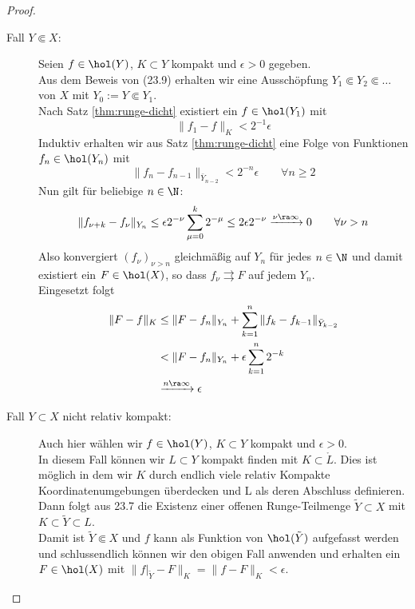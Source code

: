 \begin{proof}
  \begin{description}
  \item[Fall $Y \Subset X$:] Seien $f \in \hol(Y)$, $K \subset Y$
    kompakt und $\epsilon > 0$ gegeben. \\
    Aus dem Beweis von (23.9) erhalten wir eine Ausschöpfung $Y_1
    \Subset Y_2 \Subset \dots$ von $X$ mit $Y_0 := Y \Subset Y_1$. \\
    Nach Satz \ref{thm:runge-dicht} existiert ein $f \in \hol(Y_1)$
    mit
    \[
    \|f_1 - f\|_K < 2^{-1} \epsilon
    \]
    Induktiv erhalten wir aus Satz \ref{thm:runge-dicht} eine Folge
    von Funktionen $f_n \in \hol(Y_n)$ mit
    \[
    \|f_n - f_{n-1}\|_{\bar Y_{n-2}} < 2^{-n} \epsilon \qquad \forall
    n \geq 2
    \]
    Nun gilt für beliebige $n \in \N$:
    \[
    \|f_{\nu + k} - f_{\nu} \|_{Y_n} \leq \epsilon 2^{-\nu} \sum_{\mu
      = 0}^k 2^{-\mu} \leq 2 \epsilon 2^{-\nu} \xrightarrow{\nu \ra
      \infty} 0 \qquad \forall \nu > n
    \]
    Also konvergiert $(f_\nu)_{\nu > n}$ gleichmäßig auf $Y_n$ für
    jedes $n \in \N$ und damit existiert ein $F \in \hol(X)$, so dass
    $f_\nu \rightrightarrows F$ auf jedem $Y_n$. \\
    Eingesetzt folgt
    \begin{align*}
      \|F - f\|_K & \leq \|F - f_n\|_{Y_n} + \sum_{k=1}^n \|f_k -
      f_{k-1}\|_{\bar Y_{k-2}} \\
      & < \|F - f_n \|_{Y_n} + \epsilon \sum_{k=1}^n 2^{-k} \\
      & \xrightarrow{n \ra \infty} \epsilon
    \end{align*}
  \item[Fall $Y \subset X$ nicht relativ kompakt:] Auch hier wählen
    wir $f \in \hol(Y)$, $K \subset Y$ kompakt und $\epsilon > 0$. \\
    In diesem Fall können wir $L \subset Y$ kompakt finden mit $K \subset
    \mathring L$. Dies ist möglich in dem wir $K$ durch endlich viele relativ
    Kompakte Koordinatenumgebungen überdecken und L als deren
    Abschluss definieren. \\
    Dann folgt aus 23.7 die Existenz einer offenen Runge-Teilmenge
    $\tilde Y \subset X$ mit $K \subset \tilde Y \subset L$. \\
    Damit ist $\tilde Y \Subset X$ und $f$ kann als Funktion von
    $\hol(\tilde Y)$ aufgefasst werden und schlussendlich können wir
    den obigen Fall anwenden und erhalten ein $F \in \hol(X)$ mit
    $\|f|_{\tilde Y} - F\|_K = \|f - F\|_K < \epsilon$.
  \end{description}
\end{proof}

